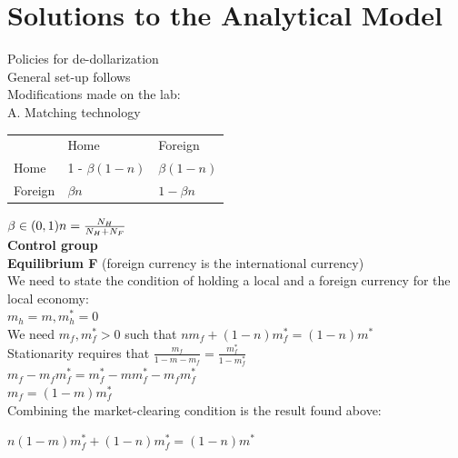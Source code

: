 \section{Solutions to the Analytical Model}

 Policies for de-dollarization \\
General set-up follows \citep{MKM}\\ 
 Modifications made on the lab: \\
 A. Matching technology\\ 

 \begin{table}[tbh]
\begin{tabular}{lll}
 & Home & Foreign \\
Home & 1 - $\beta( 1 - n )$ & $\beta ( 1 - n )$ \\
Foreign & $\beta n$ &  $1- \beta n$
\end{tabular}
\end{table}

$\beta \in (0,1)\\  
 n = \frac { N_H } { N_H + N_F } $
\\

\textbf{Control group}\\
\textbf{Equilibrium F} (foreign currency is the international currency)\\

We need to state the condition of holding a local and a foreign currency for the local economy:\\

$m _ { h } = m , m ^ { * }_h = 0$\\
We need $m _ { f } , m _ { f } ^ { * } > 0$ such that $n m_ { f } + ( 1 - n ) m _ { f } ^ { * } = ( 1 - n ) m ^ { * }$\\

Stationarity requires that $\frac{m _ { f }}{1-m-m_f} = \frac{m^* _ { f }}{1-m _ { f } ^ { * }}  $\\

$m _ { f } - m _ { f } m _ { f } ^ { * } = m _ { f } ^ { * } -m m _ { f } ^ { * } - m _ { f } m _ { f } ^ { * }$\\

$m _ { f }= (1- m) m _ { f } ^ { * } $\\

Combining the market-clearing condition is the result found above:

$n(1-m)m _ { f }^* +( 1 - n)   m _ { f } ^ { * } =(1-n)m^*$\\


